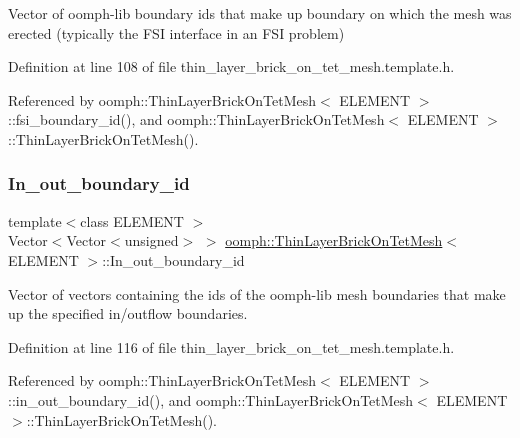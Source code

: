 Vector of oomph-\/lib boundary ids that make up boundary on which the mesh was erected (typically the F\+SI interface in an F\+SI problem) 



Definition at line 108 of file thin\+\_\+layer\+\_\+brick\+\_\+on\+\_\+tet\+\_\+mesh.\+template.\+h.



Referenced by oomph\+::\+Thin\+Layer\+Brick\+On\+Tet\+Mesh$<$ E\+L\+E\+M\+E\+N\+T $>$\+::fsi\+\_\+boundary\+\_\+id(), and oomph\+::\+Thin\+Layer\+Brick\+On\+Tet\+Mesh$<$ E\+L\+E\+M\+E\+N\+T $>$\+::\+Thin\+Layer\+Brick\+On\+Tet\+Mesh().

\mbox{\label{classoomph_1_1ThinLayerBrickOnTetMesh_aa8990092c886c1f5ac89b4476bf75b39}} 
\subsubsection{\texorpdfstring{In\+\_\+out\+\_\+boundary\+\_\+id}{In\_out\_boundary\_id}}
{\footnotesize\ttfamily template$<$class E\+L\+E\+M\+E\+NT $>$ \\
Vector$<$Vector$<$unsigned$>$ $>$ \hyperlink{classoomph_1_1ThinLayerBrickOnTetMesh}{oomph\+::\+Thin\+Layer\+Brick\+On\+Tet\+Mesh}$<$ E\+L\+E\+M\+E\+NT $>$\+::In\+\_\+out\+\_\+boundary\+\_\+id\hspace{0.3cm}{\ttfamily [private]}}



Vector of vectors containing the ids of the oomph-\/lib mesh boundaries that make up the specified in/outflow boundaries. 



Definition at line 116 of file thin\+\_\+layer\+\_\+brick\+\_\+on\+\_\+tet\+\_\+mesh.\+template.\+h.



Referenced by oomph\+::\+Thin\+Layer\+Brick\+On\+Tet\+Mesh$<$ E\+L\+E\+M\+E\+N\+T $>$\+::in\+\_\+out\+\_\+boundary\+\_\+id(), and oomph\+::\+Thin\+Layer\+Brick\+On\+Tet\+Mesh$<$ E\+L\+E\+M\+E\+N\+T $>$\+::\+Thin\+Layer\+Brick\+On\+Tet\+Mesh().

\mbox{\label{classoomph_1_1ThinLayerBrickOnTetMesh_a93acb15ee2a6fd52a21c31830b2a984b}} 
